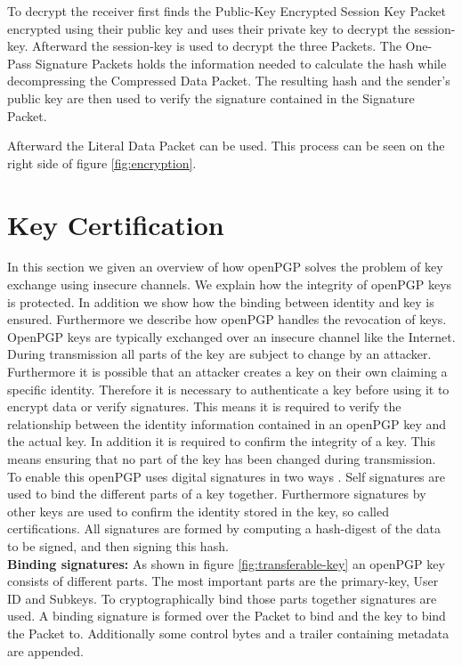 To decrypt the receiver first finds the Public-Key Encrypted Session Key Packet encrypted using their public key and uses their private key to decrypt the session-key. Afterward the session-key is used to decrypt the three Packets. The One-Pass Signature Packets holds the information needed to calculate the hash while decompressing the Compressed Data Packet. The resulting hash and the sender's public key are then used to verify the signature contained in the Signature Packet. 

Afterward the Literal Data Packet can be used. This process can be seen on the right side of figure \ref{fig:encryption}.

\section{Key Certification}
\label{section:messageformat:cert}

In this section we given an overview of how openPGP solves the problem of key exchange using insecure channels. We explain how the integrity of openPGP keys is protected. In addition we show how the binding between identity and key is ensured. Furthermore we describe how openPGP handles the revocation of keys. \\

OpenPGP keys are typically exchanged over an insecure channel like the Internet. During transmission all parts of the key are subject to change by an attacker. Furthermore it is possible that an attacker creates a key on their own claiming a specific identity. Therefore it is necessary to authenticate a key before using it to encrypt data or verify signatures.
This means it is required to verify the relationship between the identity information contained in an openPGP key and the actual key. In addition it is required to confirm the integrity of a key. This means ensuring that no part of the key has been changed during transmission. \\

To enable this openPGP uses digital signatures in two ways \cite[section 5.2.4]{RFC4880}. Self signatures are used to bind the different parts of a key together. Furthermore signatures by other keys are used to confirm the identity stored in the key, so called certifications. All signatures are formed by computing a hash-digest of the data to be signed, and then signing this hash. \\

\textbf{Binding signatures:} As shown in figure \ref{fig:transferable-key} an openPGP key consists of different parts. The most important parts are the primary-key, User ID  and Subkeys. To cryptographically bind those parts together signatures are used. A binding signature is formed over the Packet to bind and the key to bind the Packet to. Additionally some control bytes and a trailer containing metadata are appended.  \\

